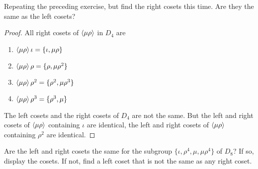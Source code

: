 \begin{exercise}
    Repeating the preceding exercise, but find the right cosets this time. Are they the same as the left cosets?
\end{exercise}

\begin{proof}
    All right cosets of $\left\langle{\mu\rho}\right\rangle$ in $D_{4}$ are
    \begin{enumerate}[label={(\arabic*)}]
        \item $\left\langle{\mu\rho}\right\rangle\iota = \{ \iota, \mu\rho \}$
        \item $\left\langle{\mu\rho}\right\rangle\rho = \{ \rho, \mu\rho^{2} \}$
        \item $\left\langle{\mu\rho}\right\rangle\rho^{2} = \{ \rho^{2}, \mu\rho^{3} \}$
        \item $\left\langle{\mu\rho}\right\rangle\rho^{3} = \{ \rho^{3}, \mu \}$
    \end{enumerate}

    The left cosets and the right cosets of $D_{4}$ are not the same. But the left and right cosets of $\left\langle{\mu\rho}\right\rangle$ containing $\iota$ are identical, the left and right cosets of $\left\langle{\mu\rho}\right\rangle$ containing $\rho^{2}$ are identical.
\end{proof}

\begin{exercise}
    Are the left and right cosets the same for the subgroup $\{ \iota, \rho^{4}, \mu, \mu\rho^{4} \}$ of $D_{8}$? If so, display the cosets. If not, find a left coset that is not the same as any right coset.
\end{exercise}

